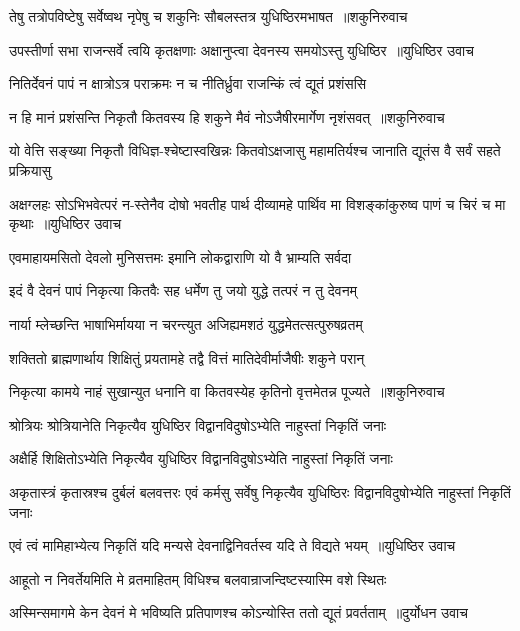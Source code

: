 \twolineshloka
{तेषु तत्रोपविष्टेषु सर्वेष्वथ नृपेषु च}
{शकुनिः सौबलस्तत्र युधिष्ठिरमभाषत ॥शकुनिरुवाच}


\threelineshloka
{उपस्तीर्णा सभा राजन्सर्वे त्वयि कृतक्षणाः}
{अक्षानुप्त्वा देवनस्य समयोऽस्तु युधिष्ठिर ॥युधिष्ठिर उवाच}
{}


\twolineshloka
{नितिर्देवनं पापं न क्षात्रोऽत्र पराक्रमः}
{न च नीतिर्ध्रुवा राजन्किं त्वं द्यूतं प्रशंससि}


\threelineshloka
{न हि मानं प्रशंसन्ति निकृतौ कितवस्य हि}
{शकुने मैवं नोऽजैषीरमार्गेण नृशंसवत् ॥शकुनिरुवाच}
{}


\twolineshloka
{यो वेत्ति सङ्ख्या निकृतौ विधिज्ञ-श्चेष्टास्वखिन्नः कितवोऽक्षजासु}
{महामतिर्यश्च जानाति द्यूतंस वै सर्वं सहते प्रक्रियासु}


\threelineshloka
{अक्षग्लहः सोऽभिभवेत्परं न-स्तेनैव दोषो भवतीह पार्थ}
{दीव्यामहे पार्थिव मा विशङ्कांकुरुष्व पाणं च चिरं च मा कृथाः ॥युधिष्ठिर उवाच}
{}


\twolineshloka
{एवमाहायमसितो देवलो मुनिसत्तमः}
{इमानि लोकद्वाराणि यो वै भ्राम्यति सर्वदा}


\twolineshloka
{इदं वै देवनं पापं निकृत्या कितवैः सह}
{धर्मेण तु जयो युद्धे तत्परं न तु देवनम्}


\twolineshloka
{नार्या म्लेच्छन्ति भाषाभिर्मायया न चरन्त्युत}
{अजिह्यमशठं युद्धमेतत्सत्पुरुषव्रतम्}


\twolineshloka
{शक्तितो ब्राह्मणार्थाय शिक्षितुं प्रयतामहे}
{तद्वै वित्तं मातिदेवीर्माजैषीः शकुने परान्}


\threelineshloka
{निकृत्या कामये नाहं सुखान्युत धनानि वा}
{कितवस्येह कृतिनो वृत्तमेतन्न पूज्यते ॥शकुनिरुवाच}
{}


\twolineshloka
{श्रोत्रियः श्रोत्रियानेति निकृत्यैव युधिष्ठिर}
{विद्वानविदुषोऽभ्येति नाहुस्तां निकृतिं जनाः}


\twolineshloka
{अक्षैर्हि शिक्षितोऽभ्येति निकृत्यैव युधिष्ठिर}
{विद्वानविदुषोऽभ्येति नाहुस्तां निकृतिं जनाः}


\threelineshloka
{अकृतास्त्रं कृतास्रश्च दुर्बलं बलवत्तरः}
{एवं कर्मसु सर्वेषु निकृत्यैव युधिष्ठिरः}
{विद्वानविदुषोभ्येति नाहुस्तां निकृतिं जनाः}


\twolineshloka
{एवं त्वं मामिहाभ्येत्य निकृतिं यदि मन्यसे}
{देवनाद्विनिवर्तस्व यदि ते विद्यते भयम् ॥युधिष्ठिर उवाच}


\twolineshloka
{आहूतो न निवर्तेयमिति मे व्रतमाहितम्}
{विधिश्च बलवान्राजन्दिष्टस्यास्मि वशे स्थितः}


\threelineshloka
{अस्मिन्समागमे केन देवनं मे भविष्यति}
{प्रतिपाणश्च कोऽन्योस्ति ततो द्यूतं प्रवर्तताम् ॥दुर्योधन उवाच}
{}


